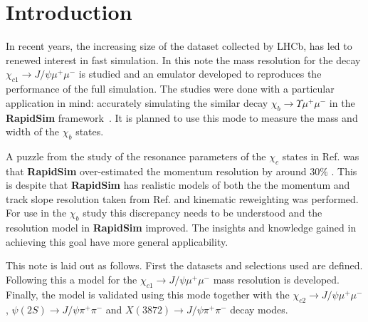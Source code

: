 \section{Introduction}
\label{sec:Introduction}
%
In recent years, the increasing size of the dataset collected
by LHCb, has led to renewed interest in fast simulation. In this note the
mass resolution for the decay $\chi_{c1} \rightarrow J/\psi \mu^+ \mu^-$ is studied and
an emulator developed to reproduces the performance of the full
simulation. The studies were done with a
particular application in mind: accurately simulating the similar
decay  $\chi_{b} \rightarrow \Upsilon \mu^+ \mu^-$ in the \textbf{RapidSim}
framework~\cite{Cowan:2016tnm}. It is planned to use this mode to
measure the mass and width of the $\chi_b$
states. 

A puzzle from the study of the resonance parameters of the $\chi_c$ states in
Ref. \cite{Anderlini:2270922} was that \textbf{RapidSim} over-estimated the momentum
resolution by around $30 \%$ \cite{LHCb-PAPER-2017-036}. This is
despite that \textbf{RapidSim} has realistic models of both the
the momentum and track slope resolution taken from Ref. \cite{Needham:1080556} and
kinematic reweighting was performed. For use in the $\chi_{b}$
study this discrepancy needs to be understood and the resolution model
in \textbf{RapidSim} improved. The insights and knowledge gained in
achieving this goal have more general
applicability. 

This note is laid out as follows. First the datasets and selections
used are defined. Following this a model for the  $\chi_{c1} \rightarrow J/\psi \mu^+ \mu^-$ mass resolution is
developed. Finally, the model is validated using this mode together
with the $\chi_{c2} \rightarrow J/\psi \mu^+ \mu^-$, 
$\psi(2S) \rightarrow J/\psi \pi^+ \pi^-$ and $X(3872) \rightarrow
J/\psi \pi^+ \pi^-$ decay modes. 